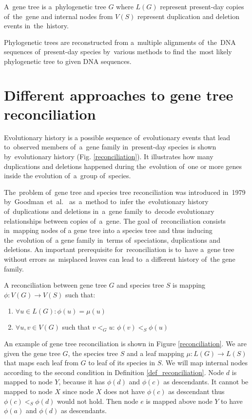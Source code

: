 A~gene tree is a~phylogenetic tree $G$ where $L(G)$ represent present-day copies of~the~gene and internal nodes from $V(S)$ represent duplication and deletion events in~the~history.

Phylogenetic trees are reconstructed from a~multiple alignments of~the~DNA sequences of~present-day species by~various methods \cite{felsenstein} to find the~most likely phylogenetic tree to given DNA sequences.

\section{Different approaches to gene tree reconciliation}
Evolutionary history is a possible sequence of~evolutionary events that lead to~observed members of~a~gene family in~present-day species is shown by~evolutionary history (Fig. \ref{reconciliation}). It illustrates how many duplications and deletions happened during the~evolution of~one or more genes inside the evolution of~a~group of~species.

The~problem of~gene tree and species tree reconciliation was introduced in~1979 by~Goodman~et~al.~\cite{goodman} as~a~method to~infer the~evolutionary history of~duplications and deletions in~a~gene family to~decode evolutionary relationships between copies of~a~gene. The goal of~reconciliation consists in~mapping nodes of a gene tree into a species tree and thus inducing the~evolution of~a gene family in~terms of~speciations, duplications and deletions. An important prerequisite for~reconciliation is to~have a~gene tree without errors as~misplaced leaves can lead to~a different history of~the gene family.

\begin{definition}
A reconciliation between gene tree $G$ and species tree $S$ is mapping $\phi: V(G) \rightarrow V(S)$ such that:
	\begin{enumerate}\itemsep0em
	\item $\forall u \in L(G): \phi(u) = \mu(u)$
	\item $\forall u, v \in V(G)$ such that $v<_Gu$: $\phi(v)<_S\phi(u)$
	\end{enumerate}
	\label{def_reconciliation}
\end{definition}

An example of gene tree reconciliation is shown in Figure \ref{reconciliation}. We are given the gene tree $G$, the species tree $S$ and a leaf mapping $\mu: L(G) \rightarrow L(S)$ that maps each leaf from $G$ to leaf of its species in $S$. We will map internal nodes according to the second condition in Definition \ref{def_reconciliation}. Node $d$ is mapped to node $Y$, because it has $\phi(d)$ and $\phi(c)$ as descendants. It cannot be mapped to node $X$ since node $X$ does not have $\phi(c)$ as descendant thus $\phi(c)<_S\phi(d)$ would not hold. Then node $e$ is mapped above node $Y$ to have $\phi(a)$ and $\phi(d)$ as descendants. 

